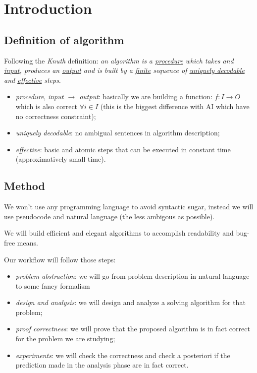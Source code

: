 \section{Introduction}

\subsection{Definition of algorithm}
Following the \emph{Knuth} definition: \emph{an algorithm is a \underline{procedure} which takes and \underline{input}, produces an \underline{output} and is built by a \underline{finite} sequence of \underline{uniquely decodable} and \underline{effective} steps}.

\begin{itemize}
    \item \emph{procedure}, \emph{input $\xrightarrow{}$ output}: basically we are building a function: $ f:I \xrightarrow{} O $ which is also correct $ \forall i \in I $ (this is the biggest difference with AI which have no correctness constraint);
    \item \emph{uniquely decodable}: no ambigual sentences in algorithm description;
    \item \emph{effective}: basic and atomic steps that can be executed in constant time (approximatively small time).
\end{itemize}

\subsection{Method}
We won't use any programming language to avoid syntactic sugar, instead we will use pseudocode and natural language (the less ambigous as possible).

We will build efficient and elegant algorithms to accomplish readability and bug-free means.

Our workflow will follow those steps:
\begin{itemize}
    \item \emph{problem abstraction}: we will go from problem description in natural language to some fancy formalism
    \item \emph{design and analysis}: we will design and analyze a solving algorithm for that problem;
    \item \emph{proof correctness}: we will prove that the proposed algorithm is in fact correct for the problem we are studying;
    \item \emph{experiments}: we will check the correctness and check a posteriori if the prediction made in the analysis phase are in fact correct.
\end{itemize}

